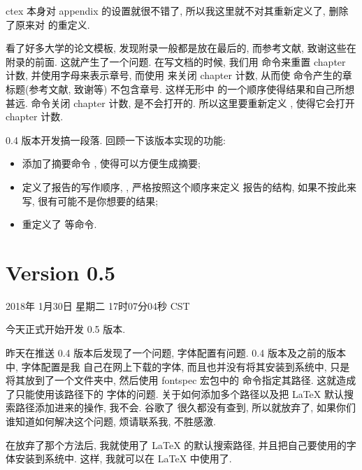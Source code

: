 \documentclass{cugrep}
\begin{document}
ctex 本身对 appendix 的设置就很不错了, 所以我这里就不对其重新定义了, 删除了原来对 
的重定义. 

看了好多大学的论文模板, 发现附录一般都是放在最后的, 而参考文献, 致谢这些在附录的前面. 这就产生了一个问题.
在写文档的时候, 我们用  命令来重置 chapter 计数, 并使用字母来表示章号, 而使用  
来关闭 chapter 计数, 从而使  命令产生的章标题(参考文献, 致谢等) 不包含章号. 这样无形中
的一个顺序使得结果和自己所想甚远.  命令关闭 chapter 计数,  是不会打开的.
所以这里要重新定义 , 使得它会打开 chapter 计数. 

0.4 版本开发搞一段落. 回顾一下该版本实现的功能:

\begin{itemize}
    \item 添加了摘要命令 , 使得可以方便生成摘要;
    \item 定义了报告的写作顺序, , 严格按照这个顺序来定义
        报告的结构, 如果不按此来写, 很有可能不是你想要的结果;
    \item 重定义了  等命令.
\end{itemize}

\section{Version 0.5}

2018年 1月30日 星期二 17时07分04秒 CST

今天正式开始开发 0.5 版本.

昨天在推送 0.4 版本后发现了一个问题, 字体配置有问题. 0.4 版本及之前的版本中, 字体配置是我
自己在网上下载的字体, 而且也并没有将其安装到系统中, 只是将其放到了一个文件夹中, 然后使用
fontspec 宏包中的 命令指定其路径. 这就造成了只能使用该路径下的
字体的问题. 关于如何添加多个路径以及把 \LaTeX{} 默认搜索路径添加进来的操作, 我不会. 谷歌了
很久都没有查到, 所以就放弃了, 如果你们谁知道如何解决这个问题, 烦请联系我, 不胜感激. 

在放弃了那个方法后, 我就使用了 \LaTeX{} 的默认搜索路径, 并且把自己要使用的字体安装到系统中.
这样, 我就可以在 \LaTeX{} 中使用了. 
\end{document}
